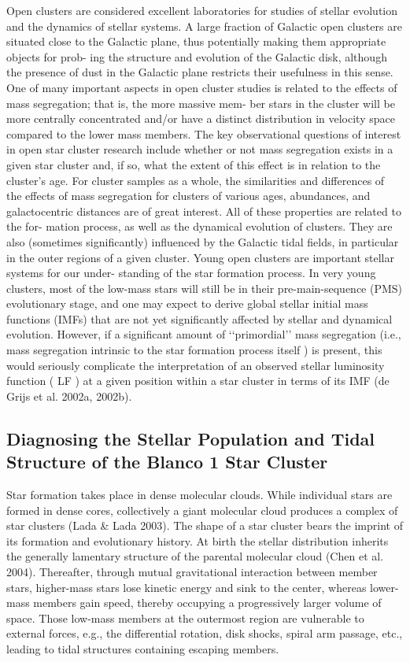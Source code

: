 \documentclass[../main.tex]{subfiles}
\begin{document}
{Open clusters are considered excellent laboratories for studies
of stellar evolution and the dynamics of stellar systems. A large
fraction of Galactic open clusters are situated close to the Galactic
plane, thus potentially making them appropriate objects for prob-
ing the structure and evolution of the Galactic disk, although the
presence of dust in the Galactic plane restricts their usefulness in
this sense.
One of many important aspects in open cluster studies is related
to the effects of mass segregation; that is, the more massive mem-
ber stars in the cluster will be more centrally concentrated and/or
have a distinct distribution in velocity space compared to the lower
mass members. The key observational questions of interest in open
star cluster research include whether or not mass segregation exists
in a given star cluster and, if so, what the extent of this effect is in
relation to the cluster’s age. For cluster samples as a whole, the
similarities and differences of the effects of mass segregation for
clusters of various ages, abundances, and galactocentric distances
are of great interest. All of these properties are related to the for-
mation process, as well as the dynamical evolution of clusters.
They are also (sometimes significantly) influenced by the Galactic
tidal fields, in particular in the outer regions of a given cluster.
Young open clusters are important stellar systems for our under-
standing of the star formation process. In very young clusters, most
of the low-mass stars will still be in their pre-main-sequence (PMS)
evolutionary stage, and one may expect to derive global stellar initial mass functions (IMFs) that are not yet significantly affected
by stellar and dynamical evolution. However, if a significant amount
of ‘‘primordial’’ mass segregation (i.e., mass segregation intrinsic
to the star formation process itself ) is present, this would seriously
complicate the interpretation of an observed stellar luminosity
function ( LF ) at a given position within a star cluster in terms
of its IMF (de Grijs et al. 2002a, 2002b).

\subsection{Diagnosing the Stellar Population and Tidal Structure of the Blanco 1 Star Cluster}

Star formation takes place in dense molecular clouds. While
individual stars are formed in dense cores, collectively a giant
molecular cloud produces a complex of star clusters (Lada &
Lada 2003). The shape of a star cluster bears the imprint of its
formation and evolutionary history. At birth the stellar
distribution inherits the generally lamentary structure of the
parental molecular cloud (Chen et al. 2004). Thereafter,
through mutual gravitational interaction between member stars,
higher-mass stars lose kinetic energy and sink to the center,
whereas lower-mass members gain speed, thereby occupying a
progressively larger volume of space. Those low-mass
members at the outermost region are vulnerable to external
forces, e.g., the differential rotation, disk shocks, spiral arm
passage, etc., leading to tidal structures containing escaping
members.

}
\end{document}
